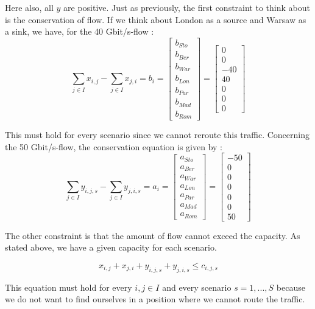 Here also, all $y$ are positive. Just as previously, the first constraint to think about is the conservation of flow. If we think about London as a source and Warsaw as a sink, we have, for the 40 Gbit/s-flow : 
$$\sum_{j\in I} x_{i,j} - \sum_{j\in I}x_{j,i} = b_i = \begin{bmatrix}
  b_{Sto}\\
  b_{Ber}\\
  b_{War}\\
  b_{Lon}\\
  b_{Par}\\
  b_{Mad}\\
  b_{Rom}
 \end{bmatrix} =
 \begin{bmatrix}
  0\\
  0\\
  -40\\
  40\\
  0\\
  0\\
  0
 \end{bmatrix}$$
 
 This must hold for every scenario since we cannot reroute this traffic. Concerning the 50 Gbit/s-flow, the conservation equation is given by : 
 $$\sum_{j\in I} y_{i,j,s} - \sum_{j\in I}y_{j,i,s} = a_i = \begin{bmatrix}
  a_{Sto}\\
  a_{Ber}\\
  a_{War}\\
  a_{Lon}\\
  a_{Par}\\
  a_{Mad}\\
  a_{Rom}
 \end{bmatrix} =
 \begin{bmatrix}
  -50\\
  0\\
  0\\
  0\\
  0\\
  0\\
  50
 \end{bmatrix}$$
 
 The other constraint is that the amount of flow cannot exceed the capacity. As stated above, we have a given capacity for each scenario. 
 
 $$x_{i,j}+x_{j,i}+y_{i,j,s}+y_{j,i,s} \leq c_{i,j,s}$$
 
 This equation must hold for every $i,j \in I$ and every scenario $s=1,...,S$ because we do not want to find ourselves in a position where we cannot route the traffic.



 